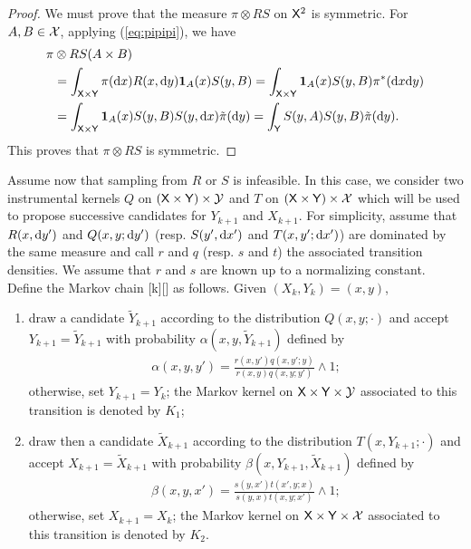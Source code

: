 \documentclass[english,graybox,envcountchap,envcountsame,sectrefs,shortlabels]{svmono}
\theoremstyle{style}
\newcommand{\Yset}{\mathsf{Y}}
\newcommand{\Ysigma}{\mathcal{Y}}
\newcommand{\eqsp}{}
\begin{document}
\begin{proof}
We must prove that the measure $\pi\otimes RS$ on $\mathsf{X}^2$ is
  symmetric. For $A,B\in\mathcal{X}$, applying (\ref{eq:pipipi}), we have
  \begin{align*}
    \pi & \otimes RS(A\times B) \\
        & = \int_{\Xset\times\Yset} \pi(\rmd x) R(x,\rmd y) \indi{A}(x)  S(y,B)
          = \int_{\Xset\times\Yset}  \indi{A}(x)  S(y,B) \pi^*(\rmd x \rmd y) \\
        & = \int_{\Xset\times\Yset}  \indi{A}(x)  S(y,B) S(y,\rmd x) \tilde\pi(\rmd y)
          = \int_{\Yset}    S(y,A) S(y,B) \tilde\pi(\rmd y) \eqsp .
  \end{align*}
  This proves that $\pi\otimes RS$ is symmetric.
\end{proof}
%
Assume now that sampling from $R$ or $S$ is infeasible. In this case, we consider two instrumental
kernels $Q$ on $(\Xset \times \Yset) \times \Ysigma$ and $T$ on
$(\Xset \times \Yset) \times \Xsigma$ which will be used to propose successive candidates for
$Y_{k+1}$ and $X_{k+1}$. For simplicity, assume that $R(x,\mathrm{d} y')$ and $Q(x,y;\mathrm{d} y')$
(resp. $S(y',\mathrm{d} x')$ and $T(x,y';\mathrm{d} x')$) are dominated by the same measure and call $r$ and $q$
(resp. $s$ and $t$) the associated transition densities. We assume that $r$ and $s$ are known up to
a normalizing constant. Define the Markov chain [k][\nset] as follows. Given
$(X_k,Y_k)=(x,y)$,
\begin{enumerate}[({DA}1)]
\item \label{item:da:first} draw a candidate $\tilde{Y}_{k+1}$ according to the distribution
  $Q(x,y;\cdot)$ and accept $Y_{k+1}=\tilde{Y}_{k+1}$ with probability $\alpha(x,y,\tilde{Y}_{k+1})$
  defined by
  \begin{align*}
    \alpha(x,y,y') = \frac{r(x,y') q(x,y';y)}{r(x,y)q(x,y;y')} \wedge 1 \eqsp ;
  \end{align*}
  otherwise, set $Y_{k+1}=Y_k$; the Markov kernel on $\Xset\times\Yset\times\Ysigma$ associated to
  this transition is denoted by $K_1$;
\item \label{item:da:second} draw then a candidate $\tilde{X}_{k+1}$ according to the distribution
  $T(x,Y_{k+1};\cdot)$ and accept $X_{k+1}=\tilde{X}_{k+1}$ with probability
  $\beta(x,Y_{k+1},\tilde{X}_{k+1})$ defined by
  \begin{align*}
    \beta(x,y,x') = \frac{s(y,x') t(x',y;x)}{s(y,x)t(x,y;x')} \wedge 1 \eqsp ;
  \end{align*}
  otherwise, set $X_{k+1}=X_k$; the Markov kernel on $\Xset\times\Yset\times\Xsigma$ associated to
  this transition is denoted by $K_2$.
\end{enumerate}
\end{document}
